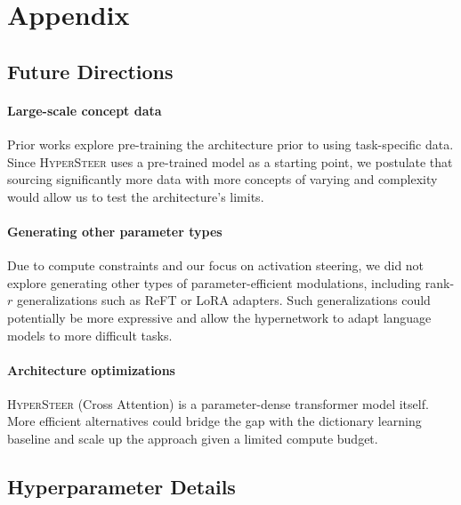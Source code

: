 \documentclass[11pt]{article}
\newcommand{\methodname}{\textsc{HyperSteer}}
\begin{document}


%



\appendix

\section{Appendix}
\label{sec:appendix}
\subsection{Future Directions}
\label{app:futuredirections}

\paragraph{Large-scale concept data} Prior works \cite{pmlr-v202-phang23a} explore pre-training the architecture prior to using task-specific data. Since \methodname\; uses a pre-trained model as a starting point, we postulate that sourcing significantly more data with more concepts of varying and complexity would allow us to test the architecture's limits.
\paragraph{Generating other parameter types} Due to compute constraints and our focus on activation steering, we did not explore generating other types of parameter-efficient modulations, including rank-$r$ generalizations such as ReFT \cite{wu2024reft} or LoRA \cite{hu2022lora} adapters. Such generalizations could potentially be more expressive and allow the hypernetwork to adapt language models to more difficult tasks.
\paragraph{Architecture optimizations} \methodname\; (Cross Attention) is a parameter-dense transformer model itself. More efficient alternatives could bridge the gap with the dictionary learning baseline and scale up the approach given a limited compute budget.

\subsection{Hyperparameter Details}
\end{document}
